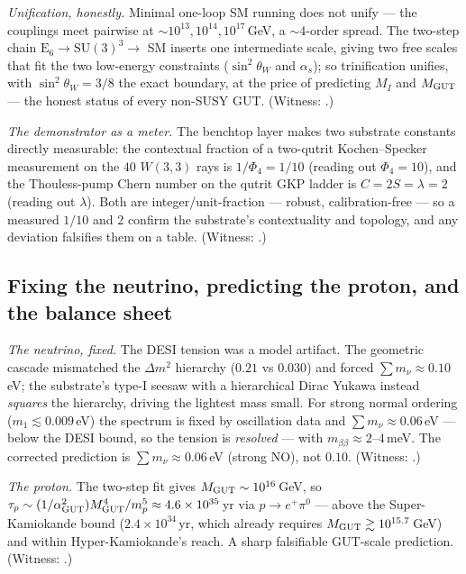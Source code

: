 \documentclass[11pt]{article}
\begin{document}
\emph{Unification, honestly.} Minimal one-loop SM running does not unify --- the
couplings meet pairwise at $\sim10^{13},10^{14},10^{17}$\,GeV, a $\sim$4-order
spread. The two-step chain $\mathrm E_6\to\mathrm{SU}(3)^3\to$ SM inserts one
intermediate scale, giving two free scales that fit the two low-energy constraints
($\sin^2\theta_W$ and $\alpha_s$); so trinification unifies, with
$\sin^2\theta_W=3/8$ the exact boundary, at the price of predicting $M_I$ and
$M_{\rm GUT}$ --- the honest status of every non-SUSY GUT. (Witness:
.)

\emph{The demonstrator as a meter.} The benchtop layer makes two substrate
constants directly measurable: the contextual fraction of a two-qutrit
Kochen--Specker measurement on the $40$ $W(3,3)$ rays is $1/\Phi_4=1/10$ (reading
out $\Phi_4=10$), and the Thouless-pump Chern number on the qutrit GKP ladder is
$C=2S=\lambda=2$ (reading out $\lambda$). Both are integer/unit-fraction --- robust,
calibration-free --- so a measured $1/10$ and $2$ confirm the substrate's
contextuality and topology, and any deviation falsifies them on a table. (Witness:
.)

\subsection{Fixing the neutrino, predicting the proton, and the balance sheet}

\emph{The neutrino, fixed.} The DESI tension was a model artifact. The geometric
cascade mismatched the $\Delta m^2$ hierarchy ($0.21$ vs $0.030$) and forced
$\sum m_\nu\approx0.10$\,eV; the substrate's type-I seesaw with a hierarchical
Dirac Yukawa instead \emph{squares} the hierarchy, driving the lightest mass small.
For strong normal ordering ($m_1\lesssim0.009$\,eV) the spectrum is fixed by
oscillation data and $\sum m_\nu\approx0.06$\,eV --- below the DESI bound, so the
tension is \emph{resolved} --- with $m_{\beta\beta}\approx2$--$4$\,meV. The
corrected prediction is $\sum m_\nu\approx0.06$\,eV (strong NO), not $0.10$.
(Witness: .)

\emph{The proton.} The two-step fit gives $M_{\rm GUT}\sim10^{16}$\,GeV, so
$\tau_p\sim(1/\alpha_{\rm GUT}^2)M_{\rm GUT}^4/m_p^5\approx4.6\times10^{35}$\,yr
via $p\to e^+\pi^0$ --- above the Super-Kamiokande bound ($2.4\times10^{34}$\,yr,
which already requires $M_{\rm GUT}\gtrsim10^{15.7}$\,GeV) and within
Hyper-Kamiokande's reach. A sharp falsifiable GUT-scale prediction. (Witness:
.)
\end{document}

